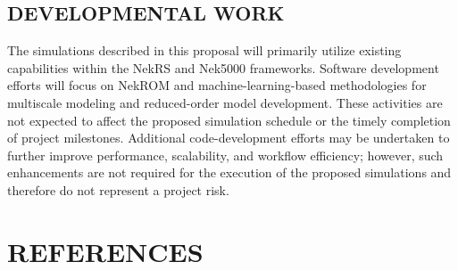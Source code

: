 

\vspace{-.25in}
\subsection*{DEVELOPMENTAL WORK}
\vspace{-.2in}

The simulations described in this proposal will primarily utilize existing capabilities within the NekRS and Nek5000 frameworks. Software development efforts will focus on NekROM and machine-learning-based methodologies for multiscale modeling and reduced-order model development. These activities are not expected to affect the proposed simulation schedule or the timely completion of project milestones. Additional code-development efforts may be undertaken to further improve performance, scalability, and workflow efficiency; however, such enhancements are not required for the execution of the proposed simulations and therefore do not represent a project risk.

\vspace{-.25in}
\section*{REFERENCES}
\vspace{-.15in}

\renewcommand{\section}[2]{}%
 


